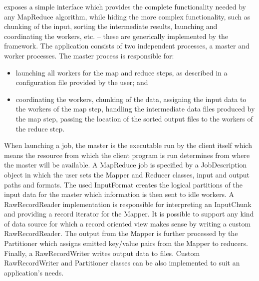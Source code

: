 \documentclass[3p,twocolumn]{elsarticle}
\begin{document}

\smr exposes a simple interface which provides the complete
functionality needed by any MapReduce algorithm, while hiding the more
complex functionality, such as chunking of the input, sorting the
intermediate results, launching and coordinating the workers, etc. --
these are generically implemented by the framework.  The application
consists of two independent processes, a master and worker processes.
The master process is responsible for:

\begin{itemize}

 \item launching all workers for the map and reduce steps, as
 described in a configuration file provided by the user; and

 \item coordinating the workers, chunking of the data, assigning the
 input data to the workers of the map step, handling the intermediate
 data files produced by the map step, passing the location of the
 sorted output files to the workers of the reduce step.  


\end{itemize}

When launching a job, the master is the executable run by the client
itself which means the resource from which the client program is run
determines from where the master will be available.  A MapReduce job
is specified by a JobDescription object in which the user sets the
Mapper and Reducer classes, input and output paths and formats.  The
used InputFormat creates the logical partitions of the input data for
the master which information is then sent to idle workers.  A
Raw\-Record\-Reader implementation is responsible for interpreting an
InputChunk and providing a record iterator for the Mapper. It is
possible to support any kind of data source for which a record
oriented view makes sense by writing a custom Raw\-Record\-Reader.
The output from the Mapper is further processed by the Partitioner
which assigns emitted key/value pairs from the Mapper to reducers.
Finally, a Raw\-Record\-Writer writes output data to files.  Custom
Raw\-Record\-Writer and Partitioner classes can be also implemented to
suit an application's needs.  
\end{document}
